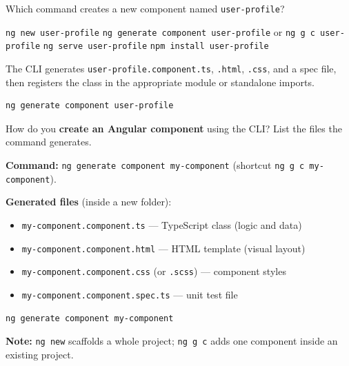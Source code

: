 \question[4]
Which command creates a new component named \texttt{user-profile}?
\begin{choices}
  \choice \lstinline[style=bashinline]|ng new user-profile|
  \CorrectChoice \lstinline[style=bashinline]|ng generate component user-profile| or \lstinline[style=bashinline]|ng g c user-profile|
  \choice \lstinline[style=bashinline]|ng serve user-profile|
  \choice \lstinline[style=bashinline]|npm install user-profile|
\end{choices}
\begin{solution}
  The CLI generates \texttt{user-profile.component.ts}, \texttt{.html}, \texttt{.css}, and a spec file, then registers the class in the appropriate module or standalone imports.
\begin{lstlisting}[style=bash]
ng generate component user-profile
\end{lstlisting}
\end{solution}

\question[6]
How do you \textbf{create an Angular component} using the CLI? List the files the command generates.
\begin{solutionorbox}[3.75in]
\textbf{Command:} \lstinline[style=bashinline]|ng generate component my-component| (shortcut \lstinline[style=bashinline]|ng g c my-component|).

\textbf{Generated files} (inside a new folder):
\begin{itemize}
  \item \texttt{my-component.component.ts} --- TypeScript class (logic and data)
  \item \texttt{my-component.component.html} --- HTML template (visual layout)
  \item \texttt{my-component.component.css} (or \texttt{.scss}) --- component styles
  \item \texttt{my-component.component.spec.ts} --- unit test file
\end{itemize}

\begin{lstlisting}[style=bash]
ng generate component my-component
\end{lstlisting}

\textbf{Note:} \lstinline[style=bashinline]|ng new| scaffolds a whole project; \lstinline[style=bashinline]|ng g c| adds one component inside an existing project.
\end{solutionorbox}





\newpage





